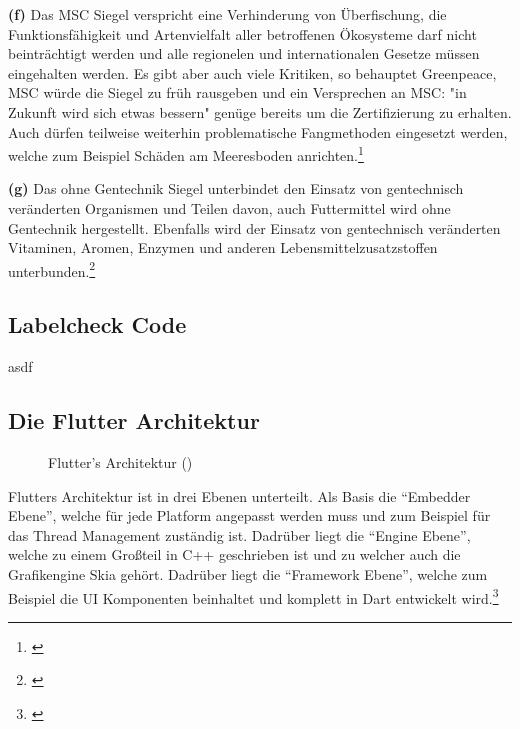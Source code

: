 \noindent\textbf{(f)} Das MSC Siegel verspricht eine Verhinderung von Überfischung, die Funktionsfähigkeit und Artenvielfalt aller betroffenen Ökosysteme darf nicht beinträchtigt werden und alle regionelen und internationalen Gesetze müssen eingehalten werden. Es gibt aber auch viele Kritiken, so behauptet Greenpeace, MSC würde die Siegel zu früh rausgeben und ein Versprechen an MSC: "in Zukunft wird sich etwas bessern" genüge bereits um die Zertifizierung zu erhalten. Auch dürfen teilweise weiterhin problematische Fangmethoden eingesetzt werden, welche zum Beispiel Schäden am Meeresboden anrichten.\footnote{\cite{msc}}

\noindent\textbf{(g)} Das ohne Gentechnik Siegel unterbindet den Einsatz von gentechnisch veränderten Organismen und Teilen davon, auch Futtermittel wird ohne Gentechnik hergestellt. Ebenfalls wird der Einsatz von gentechnisch veränderten Vitaminen, Aromen, Enzymen und anderen Lebensmittelzusatzstoffen unterbunden.\footnote{\cite{ohneGentechnik}}

\subsection{Labelcheck Code}\label{anhang:labelchecktf}

asdf

\subsection{Die Flutter Architektur}\label{anhang:flutterarc}

\begin{figure}[H]
    \centering
    \resizebox{\textwidth}{!}{
        
    }
    \caption{Flutter's Architektur (\cite{flutterarchitecture})}
\end{figure}

Flutters Architektur ist in drei Ebenen unterteilt. Als Basis die "`Embedder Ebene"', welche für jede Platform angepasst werden muss und zum Beispiel für das Thread Management zuständig ist. Dadrüber liegt die "`Engine Ebene"', welche zu einem Großteil in C++ geschrieben ist und zu welcher auch die Grafikengine Skia gehört. Dadrüber liegt die "`Framework Ebene"', welche zum Beispiel die UI Komponenten beinhaltet und komplett in Dart entwickelt wird.\footnote{\cite{flutterarchitecture}}